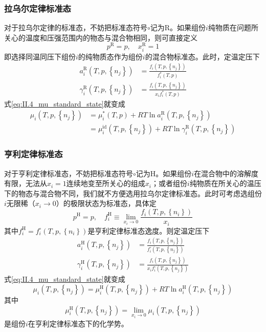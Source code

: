 \documentclass[main.tex]{subfiles}
\begin{document}
\subsubsection{拉乌尔定律标准态}
对于拉乌尔定律的标准态，不妨把标准态符号$\circ$记为R。如果组份$i$纯物质在问题所关心的温度和压强范围内的物态与混合物相同，则可直接定义
\[p^\text{R}=p,\quad x^\text{R}_i=1\]
即选择同温同压下组份$i$的纯物质态作为组份$i$的混合物标准态。此时，定温定压下
\begin{align*}
  a_i^\text{R}\left(T,p,\left\{n_j\right\}\right)      & =\frac{f_i\left(T,p,\left\{n_j\right\}\right)}{f_i^*\left(T,p\right)}    \\
  \gamma_i^\text{R}\left(T,p,\left\{n_j\right\}\right) & =\frac{f_i\left(T,p,\left\{n_j\right\}\right)}{x_if_i^*\left(T,p\right)}
\end{align*}
式\eqref{eq:II.4_mu_standard_state}就变成
\begin{align}
  \mu_i\left(T,p,\left\{n_j\right\}\right) & =\mu_i^*\left(T,p\right)+RT\ln a_i^\text{R}\left(T,p,\left\{n_j\right\}\right)\label{eq:II.4_Raoult_standard_state_activity}                                       \\
                                           & =\mu_i^\text{id}\left(T,p,\left\{n_j\right\}\right)+RT\ln\gamma_i^\text{R}\left(T,p,\left\{n_j\right\}\right)\label{eq:II.4_Raoult_standard_state_activity_factor}
\end{align}

\subsubsection{亨利定律标准态}
对于亨利定律标准态，不妨把标准态符号$\circ$记为H。如果组份$i$在混合物中的溶解度有限，无法从$x_i=1$连续地变至所关心的组成$x_i$；或者组份$i$纯物质在所关心的温压下的物态与混合物不同，我们就不方便选用拉乌尔定律标准态。此时可考虑选组份$i$无限稀（$x_i\rightarrow 0$）的极限状态为标准态，具体定
\[p^\text{H}=p,\quad f_i^\text{H}\equiv\lim_{x_i\to 0}\frac{f_i\left(T,p,\left\{n_i\right\}\right)}{x_i}\]
其中$f_i^\text{H}=f_i^\circ\left(T,p,\left\{n_i\right\}\right)$是亨利定律标准态逸度。则定温定压下
\begin{align*}
  a_i^\text{H}\left(T,p,\left\{n_j\right\}\right)      & =\frac{f_i\left(T,p,\left\{n_j\right\}\right)}{f_i^\circ\left(T,p,\left\{n_j\right\}\right)}    \\
  \gamma_i^\text{H}\left(T,p,\left\{n_j\right\}\right) & =\frac{f_i\left(T,p,\left\{n_j\right\}\right)}{x_if_i^\circ\left(T,p,\left\{n_j\right\}\right)}
\end{align*}
式\eqref{eq:II.4_mu_standard_state}就变成
\begin{equation}\label{eq:II.4_Henry_standard_state_activity}
  \mu_i\left(T,p,\left\{n_j\right\}\right) =\mu_i^\text{H}\left(T,p,\left\{n_j\right\}\right)+RT\ln a_i^\text{H}\left(T,p,\left\{n_j\right\}\right)
\end{equation}
其中
\[\mu_i^\text{H}\left(T,p,\left\{n_j\right\}\right)=\lim_{x_i\to 0}\mu_i\left(T,p,\left\{n_j\right\}\right)\]
是组份$i$在亨利定律标准态下的化学势。
\end{document}
